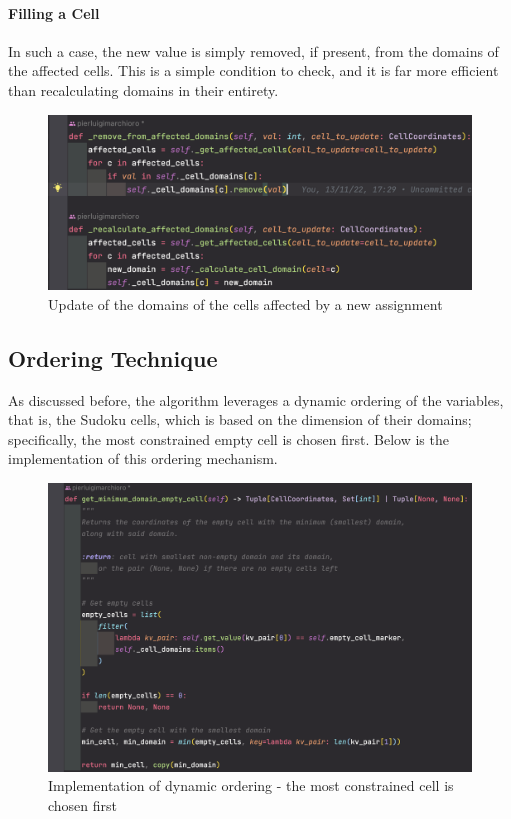 \paragraph{Filling a Cell} In such a case, the new value is simply removed, if present, from the domains of the affected cells. This is a simple condition to check, and it is far more efficient than recalculating domains in their entirety.

\begin{figure}[h]
    \centering
    \includegraphics[scale=0.65]{assignment-1/images/cp/domains-4-recalc-remove-doms.png}
    \caption{Update of the domains of the cells affected by a new assignment}
    \label{fig:domain_4}
\end{figure}

\subsection{Ordering Technique}

As discussed before, the algorithm leverages a dynamic ordering of the variables, that is, the Sudoku cells, which is based on the dimension of their domains; specifically, the most constrained empty cell is chosen first. Below is the implementation of this ordering mechanism.

\begin{figure}[h]
    \centering
    \includegraphics[scale=0.5]{assignment-1/images/cp/ordering-1.png}
    \caption{Implementation of dynamic ordering - the most constrained cell is chosen first}
    \label{fig:ordering_1}
\end{figure}



